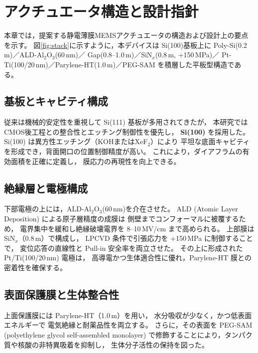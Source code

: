 \section{アクチュエータ構造と設計指針}

本章では，提案する静電薄膜MEMSアクチュエータの構造および設計上の要点を示す。
図\ref{fig:stack}に示すように，本デバイスは
Si(100)基板上に Poly-Si(0.2\,\textmu m)／ALD-Al$_2$O$_3$(60\,nm)／
Gap(0.8--1.0\,\textmu m)／SiN$_x$(0.8\,\textmu m, +150\,MPa)／
Pt-Ti(100/20\,nm)／Parylene-HT(1.0\,\textmu m)／PEG-SAM
を積層した平板型構造である。

\subsection{基板とキャビティ構成}
従来は機械的安定性を重視して Si(111) 基板が多用されてきたが，
本研究では CMOS後工程との整合性とエッチング制御性を優先し，
\textbf{Si(100)} を採用した。
Si(100) は異方性エッチング（KOHまたはXeF$_2$）により
平坦な底面キャビティを形成でき，背面開口の位置制御精度が高い。
これにより，ダイアフラムの有効面積を正確に定義し，
膜応力の再現性を向上できる。

\subsection{絶縁層と電極構成}
下部電極の上には，ALD-Al$_2$O$_3$(60\,nm)を介在させた。
ALD (Atomic Layer Deposition) による原子層精度の成膜は
側壁までコンフォーマルに被覆するため，
電界集中を緩和し絶縁破壊電界を 8--10\,MV/cm まで高められる。
上部膜は SiN$_x$（0.8\,\textmu m）で構成し，
LPCVD 条件で引張応力を +150\,MPa に制御することで，
変位応答の直線性と Pull-in 安全率を両立させた。
その上に形成された Pt/Ti(100/20\,nm) 電極は，
高導電かつ生体適合性に優れ，Parylene-HT 膜との密着性を確保する。

\subsection{表面保護膜と生体整合性}
上面保護膜には Parylene-HT（1.0\,\textmu m）を用い，
水分吸収が少なく，かつ低表面エネルギーで
電気絶縁と耐薬品性を両立する。
さらに，その表面を PEG-SAM (polyethylene glycol self-assembled monolayer)
で修飾することにより，タンパク質や核酸の非特異吸着を抑制し，
生体分子活性の保持を図った。

